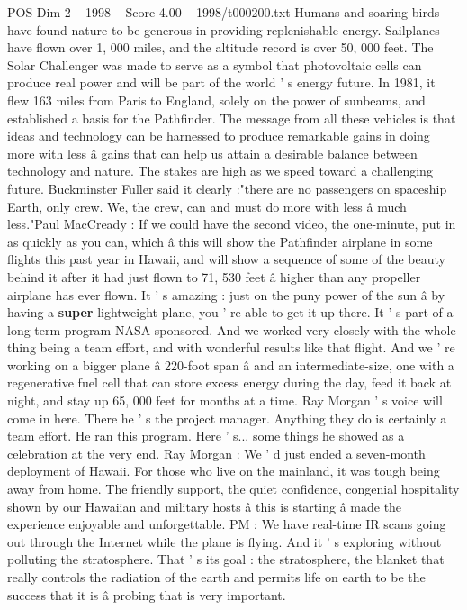 \begin{textsample}{POS Dim 2 – 1998 – Score 4.00 – 1998/t000200.txt}
Humans and soaring birds have found nature to be generous in providing replenishable energy.
Sailplanes have flown over 1, 000 miles, and the altitude record is over 50, 000 feet.
The Solar Challenger was made to serve as a symbol that photovoltaic cells can produce real power and will be part of the world ' s energy future.
In 1981, it flew 163 miles from Paris to England, solely on the power of sunbeams, and established a basis for the Pathfinder.
The message from all these vehicles is that ideas and technology can be harnessed to produce remarkable gains in doing more with less â gains that can help us attain a desirable balance between technology and nature.
The stakes are high as we speed toward a challenging future.
Buckminster Fuller said it clearly :"there are no passengers on spaceship Earth, only crew.
We, the crew, can and must do more with less â much less."Paul MacCready : If we could have the second video, the one-minute, put in as quickly as you can, which â this will show the Pathfinder airplane in some flights this past year in Hawaii, and will show a sequence of some of the beauty behind it after it had just flown to 71, 530 feet â higher than any propeller airplane has ever flown.
It ' s amazing : just on the puny power of the sun â by having a \textbf{super} lightweight plane, you ' re able to get it up there.
It ' s part of a long-term program NASA sponsored.
And we worked very closely with the whole thing being a team effort, and with wonderful results like that flight.
And we ' re working on a bigger plane â 220-foot span â and an intermediate-size, one with a regenerative fuel cell that can store excess energy during the day, feed it back at night, and stay up 65, 000 feet for months at a time.
Ray Morgan ' s voice will come in here.
There he ' s the project manager.
Anything they do is certainly a team effort.
He ran this program.
Here ' s... some things he showed as a celebration at the very end.
Ray Morgan : We ' d just ended a seven-month deployment of Hawaii.
For those who live on the mainland, it was tough being away from home.
The friendly support, the quiet confidence, congenial hospitality shown by our Hawaiian and military hosts â this is starting â made the experience enjoyable and unforgettable.
PM : We have real-time IR scans going out through the Internet while the plane is flying.
And it ' s exploring without polluting the stratosphere.
That ' s its goal : the stratosphere, the blanket that really controls the radiation of the earth and permits life on earth to be the success that it is â probing that is very important.

\end{textsample}
